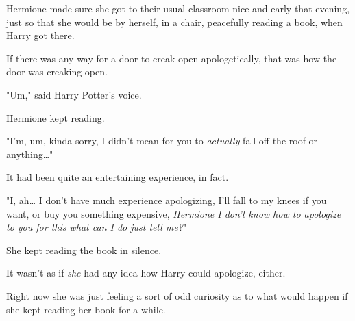 Hermione made sure she got to their usual classroom nice and early that
evening, just so that she would be by herself, in a chair, peacefully reading a
book, when Harry got there.

If there was any way for a door to creak open apologetically, that was how the
door was creaking open.

"Um," said Harry Potter's voice.

Hermione kept reading.

"I'm, um, kinda sorry, I didn't mean for you to \emph{actually} fall off the
roof or anything{\ldots}"

It had been quite an entertaining experience, in fact.

"I, ah{\ldots} I don't have much experience apologizing, I'll fall to my knees
if you want, or buy you something expensive, \emph{Hermione I don't know how to
apologize to you for this what can I do just tell me?}"

She kept reading the book in silence.

It wasn't as if \emph{she} had any idea how Harry could apologize, either.

Right now she was just feeling a sort of odd curiosity as to what would happen
if she kept reading her book for a while.
